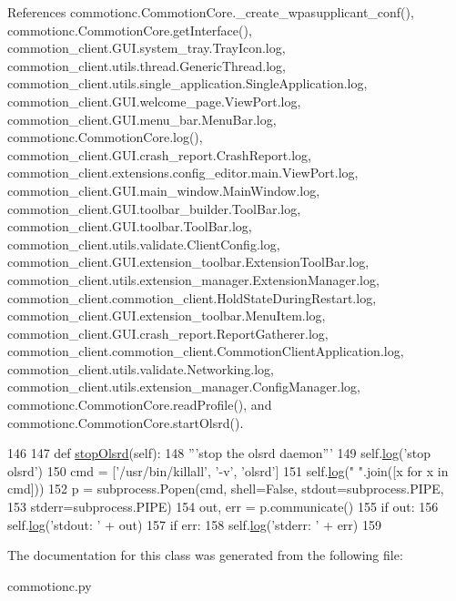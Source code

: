 References commotionc.\+Commotion\+Core.\+\_\+create\+\_\+wpasupplicant\+\_\+conf(), commotionc.\+Commotion\+Core.\+get\+Interface(), commotion\+\_\+client.\+G\+U\+I.\+system\+\_\+tray.\+Tray\+Icon.\+log, commotion\+\_\+client.\+utils.\+thread.\+Generic\+Thread.\+log, commotion\+\_\+client.\+utils.\+single\+\_\+application.\+Single\+Application.\+log, commotion\+\_\+client.\+G\+U\+I.\+welcome\+\_\+page.\+View\+Port.\+log, commotion\+\_\+client.\+G\+U\+I.\+menu\+\_\+bar.\+Menu\+Bar.\+log, commotionc.\+Commotion\+Core.\+log(), commotion\+\_\+client.\+G\+U\+I.\+crash\+\_\+report.\+Crash\+Report.\+log, commotion\+\_\+client.\+extensions.\+config\+\_\+editor.\+main.\+View\+Port.\+log, commotion\+\_\+client.\+G\+U\+I.\+main\+\_\+window.\+Main\+Window.\+log, commotion\+\_\+client.\+G\+U\+I.\+toolbar\+\_\+builder.\+Tool\+Bar.\+log, commotion\+\_\+client.\+G\+U\+I.\+toolbar.\+Tool\+Bar.\+log, commotion\+\_\+client.\+utils.\+validate.\+Client\+Config.\+log, commotion\+\_\+client.\+G\+U\+I.\+extension\+\_\+toolbar.\+Extension\+Tool\+Bar.\+log, commotion\+\_\+client.\+utils.\+extension\+\_\+manager.\+Extension\+Manager.\+log, commotion\+\_\+client.\+commotion\+\_\+client.\+Hold\+State\+During\+Restart.\+log, commotion\+\_\+client.\+G\+U\+I.\+extension\+\_\+toolbar.\+Menu\+Item.\+log, commotion\+\_\+client.\+G\+U\+I.\+crash\+\_\+report.\+Report\+Gatherer.\+log, commotion\+\_\+client.\+commotion\+\_\+client.\+Commotion\+Client\+Application.\+log, commotion\+\_\+client.\+utils.\+validate.\+Networking.\+log, commotion\+\_\+client.\+utils.\+extension\+\_\+manager.\+Config\+Manager.\+log, commotionc.\+Commotion\+Core.\+read\+Profile(), and commotionc.\+Commotion\+Core.\+start\+Olsrd().


\begin{DoxyCode}
146 
147     \textcolor{keyword}{def }\hyperlink{classcommotionc_1_1CommotionCore_a2cadf11999f9a99eb148957fafe80bbe}{stopOlsrd}(self):
148         \textcolor{stringliteral}{'''stop the olsrd daemon'''}
149         self.\hyperlink{classcommotionc_1_1CommotionCore_adc7b8770d8f4a8a63789a96d6283677a}{log}(\textcolor{stringliteral}{'stop olsrd'})
150         cmd = [\textcolor{stringliteral}{'/usr/bin/killall'}, \textcolor{stringliteral}{'-v'}, \textcolor{stringliteral}{'olsrd'}]
151         self.\hyperlink{classcommotionc_1_1CommotionCore_adc7b8770d8f4a8a63789a96d6283677a}{log}(\textcolor{stringliteral}{" "}.join([x \textcolor{keywordflow}{for} x \textcolor{keywordflow}{in} cmd]))
152         p = subprocess.Popen(cmd, shell=\textcolor{keyword}{False}, stdout=subprocess.PIPE,
153                              stderr=subprocess.PIPE)
154         out, err = p.communicate()
155         \textcolor{keywordflow}{if} out:
156             self.\hyperlink{classcommotionc_1_1CommotionCore_adc7b8770d8f4a8a63789a96d6283677a}{log}(\textcolor{stringliteral}{'stdout: '} + out)
157         \textcolor{keywordflow}{if} err:
158             self.\hyperlink{classcommotionc_1_1CommotionCore_adc7b8770d8f4a8a63789a96d6283677a}{log}(\textcolor{stringliteral}{'stderr: '} + err)
159 

\end{DoxyCode}


The documentation for this class was generated from the following file\+:\begin{DoxyCompactItemize}
\item 
commotionc.\+py\end{DoxyCompactItemize}
